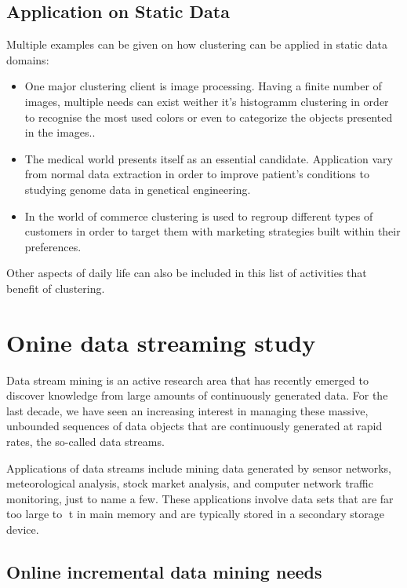 \documentclass[]{article}
\begin{document}
\subsection{Application on Static Data}

Multiple examples can be given on how clustering can be applied in static data domains: 
\begin{itemize}
	\item One major clustering client is image processing. Having a finite number of images, multiple needs can exist weither it's histogramm clustering in order to recognise the most used colors or even to categorize the objects presented in the images.\cite{wu1993optimal}.
	\item The medical world presents itself as an essential candidate\cite{cios2002uniqueness}. Application vary from normal data extraction in order to improve patient's conditions to studying genome data in genetical engineering\cite{baldi2002dna}. 
	\item In the world of commerce clustering is used to regroup different types of customers in order to target them with marketing strategies built within their preferences.
\end{itemize}

Other aspects of daily life can also be included in this list of activities that benefit of clustering.

\section{Onine data streaming study}
Data stream mining is an active research area that has recently emerged to discover knowledge from large amounts of continuously generated data. For the last decade, we have seen an increasing interest in managing these massive, unbounded sequences of data objects that are continuously generated at rapid rates, the so-called data streams\cite{chandola2011knowledge}.

Applications of data streams include mining data generated by sensor networks,
meteorological analysis, stock market analysis, and computer network traffic monitoring, just to name a few. These applications involve data sets that are far too large to t in main memory and are typically stored in a secondary storage device. 

\subsection{Online incremental data mining needs}
\end{document}
